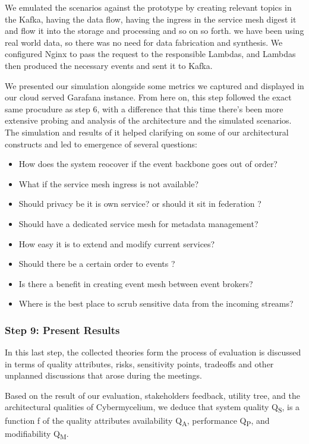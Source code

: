 \documentclass[review]{elsarticle}
\begin{document}
We emulated the scenarios against the prototype by creating relevant topics in the Kafka, having the data flow, having the ingress in the service mesh digest it and flow it into the storage and processing and so on so forth. we have been using real world data, so there was no need for data fabrication and synthesis. We configured Nginx to pass the request to the responsible Lambdas, and Lambdas then produced the necessary events and sent it to Kafka. 

We presented our simulation alongside some metrics we captured and displayed in our cloud served Garafana instance. From here on, this step followed the exact same procudure as step 6, with a difference that this time there's been more extensive probing and analysis of the architecture and the simulated scenarios. The simulation and results of it helped clarifying on some of our architectural constructs and led to emergence of several questions: 

\begin{itemize}
    \item How does the system reocover if the event backbone goes out of order?
    \item What if the service mesh ingress is not available?
    \item Should privacy be it is own service? or should it sit in federation ?
    \item Should have a dedicated service mesh for metadata management?
    \item How easy it is to extend and modify current services?
    \item Should there be a certain order to events ?
    \item Is there a benefit in creating event mesh between event brokers?
    \item Where is the best place to scrub sensitive data from the incoming streams?
\end{itemize}

\subsubsection{Step 9: Present Results} \label{evaluation-results}

In this last step, the collected theories form the process of evaluation is discussed in terms of quality attributes, risks, sensitivity points, tradeoffs and other unplanned discussions that arose during the meetings. 

Based on the result of our evaluation, stakeholders feedback, utility tree, and the architectural qualities of Cybermycelium, we deduce that system quality Q\textsubscript{S}, is a function f of the quality attributes availability Q\textsubscript{A}, performance Q\textsubscript{P}, and modifiability Q\textsubscript{M}.
\end{document}
